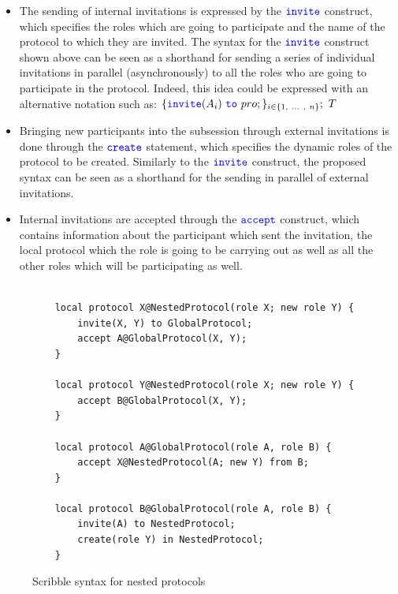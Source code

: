 \documentclass[12pt,twoside]{report}
\begin{document}
\begin{itemize}
    \item The sending of internal invitations is expressed by the ${\color{blue}\mathtt{invite}}$ construct, which specifies the roles which are going to participate and the name of the protocol to which they are invited. The syntax for the ${\color{blue}\mathtt{invite}}$ construct shown above can be seen as a shorthand for sending a series of individual invitations in parallel (asynchronously) to all the roles who are going to participate in the protocol. Indeed, this idea could be expressed with an alternative notation such as:
    $\{\invite(A_i)\ \scrto\ pro;\}_{i \in \{1,\ ...\ ,\ n\}};\ T$

    \item Bringing new participants into the subsession through external invitations is done through the ${\color{blue}\mathtt{create}}$ statement, which specifies the dynamic roles of the protocol to be created. Similarly to the ${\color{blue}\mathtt{invite}}$ construct, the proposed syntax can be seen as a shorthand for the sending in parallel of external invitations.
    
    \item Internal invitations are accepted through the ${\color{blue}\mathtt{accept}}$ construct, which contains information about the participant which sent the invitation, the local protocol which the role is going to be carrying out as well as all the other roles which will be participating as well.
\end{itemize}

\begin{figure}[htb!]
    \centering
    \lstset{language=Scribble}
    \begin{lstlisting}
    
    local protocol X@NestedProtocol(role X; new role Y) {
        invite(X, Y) to GlobalProtocol;
        accept A@GlobalProtocol(X, Y);
    }

    local protocol Y@NestedProtocol(role X; new role Y) {
        accept B@GlobalProtocol(X, Y);
    }
    
    local protocol A@GlobalProtocol(role A, role B) {
        accept X@NestedProtocol(A; new Y) from B;
    }

    local protocol B@GlobalProtocol(role A, role B) {
        invite(A) to NestedProtocol;
        create(role Y) in NestedProtocol;
    }
    \end{lstlisting}
    \caption{Scribble syntax for nested protocols}
    \label{scribble-nested-local}
\end{figure}{}
\end{document}
